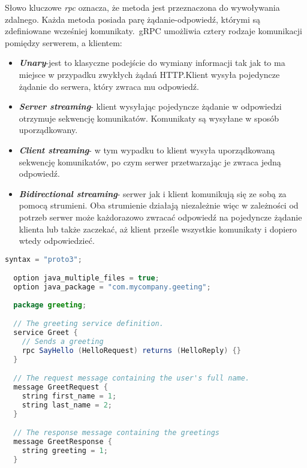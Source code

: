 \noindent
Słowo kluczowe \textit{rpc} oznacza, że metoda jest przeznaczona do wywoływania zdalnego. Każda metoda posiada parę żądanie-odpowiedź, którymi są zdefiniowane wcześniej komunikaty.\ gRPC umożliwia cztery rodzaje komunikacji pomiędzy serwerem, a klientem:
\begin{itemize}
  \item \textbf{\textit{Unary}}-jest to klasyczne podejście do wymiany informacji tak jak to ma miejsce w przypadku zwykłych żądań HTTP.\@ Klient wysyła pojedyncze żądanie do serwera, który zwraca mu odpowiedź.
  \item \textbf{\textit{Server streaming}}- klient wysyłając pojedyncze żądanie w odpowiedzi otrzymuje sekwencję komunikatów. Komunikaty są wysyłane w sposób uporządkowany.
  \item \textbf{\textit{Client streaming}}- w tym wypadku to klient wysyła uporządkowaną sekwencję komunikatów, po czym serwer przetwarzając je zwraca jedną odpowiedź.
  \item \textbf{\textit{Bidirectional streaming}}- serwer jak i klient komunikują się ze sobą za pomocą strumieni. Oba strumienie działają niezależnie więc w zależności od potrzeb serwer może każdorazowo zwracać odpowiedź na pojedyncze żądanie klienta lub także zaczekać, aż klient prześle wszystkie komunikaty i dopiero wtedy odpowiedzieć.
\end{itemize}
\begin{lstlisting}[language=java, caption=Przykład definicji usługi w pliku proto]
  syntax = "proto3";

  option java_multiple_files = true;
  option java_package = "com.mycompany.geeting";
 
  package greeting;

  // The greeting service definition.
  service Greet {
    // Sends a greeting
    rpc SayHello (HelloRequest) returns (HelloReply) {}
  }

  // The request message containing the user's full name.
  message GreetRequest {
    string first_name = 1;
    string last_name = 2;
  }

  // The response message containing the greetings
  message GreetResponse {
    string greeting = 1;
  }
\end{lstlisting}